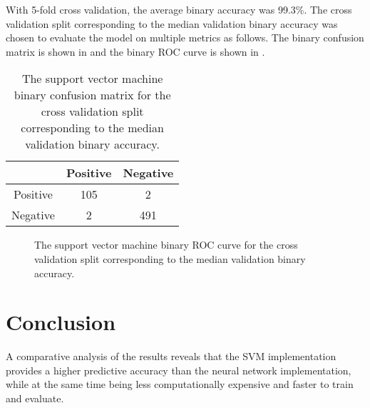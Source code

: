 \documentclass[twocolumn]{article}
\begin{document}
With 5-fold cross validation, the average binary accuracy was 99.3\%. The cross
validation split corresponding to the median validation binary accuracy was
chosen to evaluate the model on multiple metrics as follows. The binary
confusion matrix is shown in  and
the binary ROC curve is shown in .

\begin{table}
\begin{center}
\begin{tabular}{ccc}
\toprule
& Positive & Negative \\
\midrule
Positive & 105 & 2 \\
Negative & 2 & 491 \\
\bottomrule
\end{tabular}
\end{center}
\caption{The support vector machine binary confusion matrix for the cross
  validation split corresponding to the median validation binary accuracy.}
\label{tab:SupportVectorMachineConfusionMatrix}
\end{table}

\begin{figure}
\begin{center}
\end{center}
\caption{The support vector machine binary ROC curve for the cross validation
  split corresponding to the median validation binary accuracy.}
\label{fig:SupportVectorMachineROC}
\end{figure}

\section{Conclusion}
\label{sec:Conclusion}

A comparative analysis of the results reveals that the SVM implementation
provides a higher predictive accuracy than the neural network implementation,
while at the same time being less computationally expensive and faster to train
and evaluate.

\printbibliography
\end{document}
